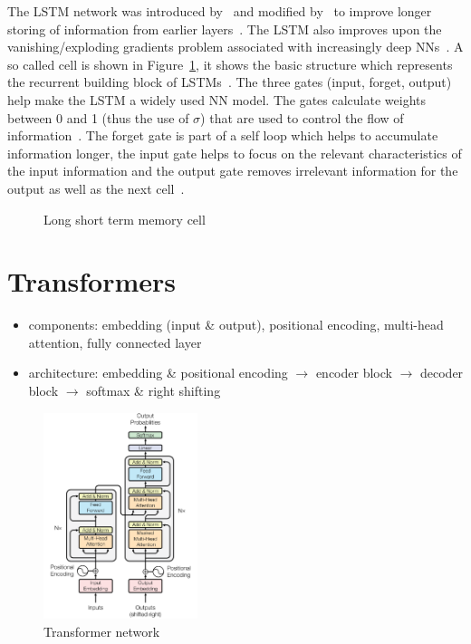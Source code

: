 The \ac{LSTM} network was introduced by~\cite{hochreiter_long_1997} and modified
by~\cite{gers_learning_1999} to improve longer storing of information from earlier
layers~\citep{chauhan_review_2018}.
The \ac{LSTM} also improves upon the vanishing/exploding gradients problem associated with
increasingly deep \acp{NN}~\citep{sherstinsky_fundamentals_2020}.
A so called cell is shown in Figure~\ref{fig:lstm}, it shows the basic structure which represents
the recurrent building block of \acp{LSTM}~\citep{goodfellow_deep_2016}.
The three gates (input, forget, output) help make the \ac{LSTM} a widely used \ac{NN} model.
The gates calculate weights between 0 and 1 (thus the use of $\sigma$) that are used to control
the flow of information~\citep{goodfellow_deep_2016}.
The forget gate is part of a self loop which helps to accumulate information longer, the input
gate helps to focus on the relevant characteristics of the input information
and the output gate removes irrelevant information for the output as well as the next
cell~\citep{goodfellow_deep_2016}.
\begin{figure}[ht]
    \centering
    
    \caption{Long short term memory cell~\citep{goodfellow_deep_2016}\label{fig:lstm}}
\end{figure}

\section{Transformers}
\begin{itemize}
    \item components: embedding (input \& output), positional encoding, multi-head attention,
        fully connected layer
    \item architecture: embedding \& positional encoding $\rightarrow$ encoder block
        $\rightarrow$ decoder block $\rightarrow$ softmax \& right shifting
\end{itemize}

\begin{figure}[ht]
    \centering
    \includegraphics[width=0.4\textwidth]{img/Transformer-Waswani-Attention-2017.png}
    \caption{Transformer network~\citep{vaswani_attention_2017}\label{fig:transformer}}
\end{figure}

